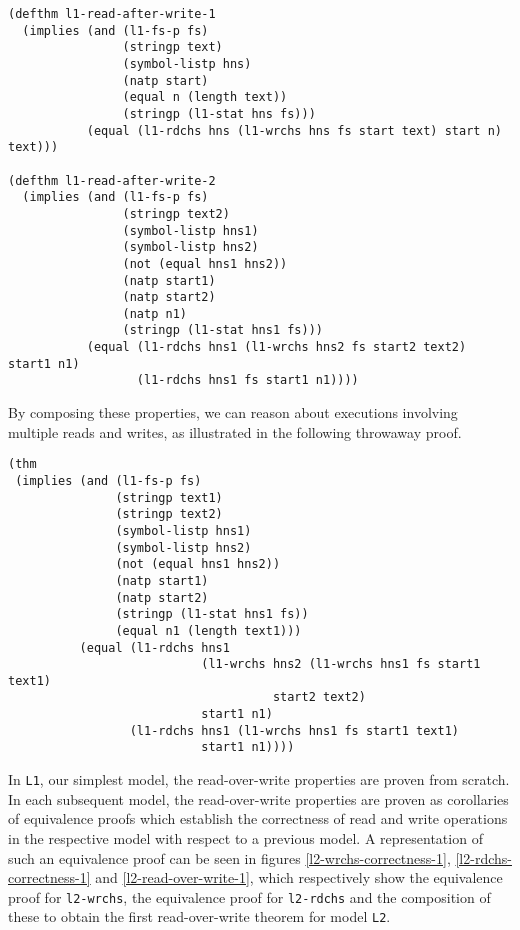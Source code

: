 \documentclass[submission,copyright,creativecommons]{eptcs}
\begin{document}
\medskip

\noindent
\begin{verbatim}
(defthm l1-read-after-write-1
  (implies (and (l1-fs-p fs)
                (stringp text)
                (symbol-listp hns)
                (natp start)
                (equal n (length text))
                (stringp (l1-stat hns fs)))
           (equal (l1-rdchs hns (l1-wrchs hns fs start text) start n) text)))

(defthm l1-read-after-write-2
  (implies (and (l1-fs-p fs)
                (stringp text2)
                (symbol-listp hns1)
                (symbol-listp hns2)
                (not (equal hns1 hns2))
                (natp start1)
                (natp start2)
                (natp n1)
                (stringp (l1-stat hns1 fs)))
           (equal (l1-rdchs hns1 (l1-wrchs hns2 fs start2 text2) start1 n1)
                  (l1-rdchs hns1 fs start1 n1))))
\end{verbatim}

By composing these properties, we can reason about executions
involving multiple reads and writes, as illustrated in the following
throwaway proof.

\medskip

\noindent
\begin{verbatim}
(thm
 (implies (and (l1-fs-p fs)
               (stringp text1)
               (stringp text2)
               (symbol-listp hns1)
               (symbol-listp hns2)
               (not (equal hns1 hns2))
               (natp start1)
               (natp start2)
               (stringp (l1-stat hns1 fs))
               (equal n1 (length text1)))
          (equal (l1-rdchs hns1
                           (l1-wrchs hns2 (l1-wrchs hns1 fs start1 text1)
                                     start2 text2)
                           start1 n1)
                 (l1-rdchs hns1 (l1-wrchs hns1 fs start1 text1)
                           start1 n1))))
\end{verbatim}

In \texttt{L1}, our simplest model, the read-over-write properties
are proven from scratch. In each subsequent model, the read-over-write
properties are proven as corollaries of equivalence proofs which
establish the correctness of read and write operations in the
respective model with respect to a previous model. A representation of
such an equivalence proof can be seen in figures
\ref{l2-wrchs-correctness-1}, \ref{l2-rdchs-correctness-1} and
\ref{l2-read-over-write-1}, which respectively show the equivalence
proof for \texttt{l2-wrchs}, the equivalence proof for
\texttt{l2-rdchs} and the composition of these to obtain the first
read-over-write theorem for model \texttt{L2}.
\end{document}
